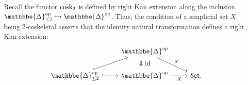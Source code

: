 \documentclass[a4paper,UKenglish,cleveref, autoref, thm-restate]{lipics-v2021}
\newcommand{\op}{\textup{op}}
\newcommand{\id}{\textup{id}}
\newcommand{\cosk}{\textup{cosk}}
\newcommand{\nerve}{\textup{nerve}}
\newcommand{\cat}[1]{\textup{\textsf{#1}}}%
\newcommand{\1}{\mathbbe{1}}
\newcommand{\2}{\mathbbe{2}}
\newcommand{\3}{\mathbbe{3}}
\newcommand{\DDelta}{\mathbbe{\Delta}}
\newcommand{\Cat}{\mathcal{C}{\kern-.75pt}\cat{at}}
\newcommand{\Set}{\mathcal{S}\cat{et}}
\begin{document}

Recall the functor $\cosk_2$ is defined by right Kan extension along the inclusion $\DDelta_{\leq 2}^\op \hookrightarrow \DDelta^\op$. Thus, the condition of a simplicial set $X$ being 2-coskeletal asserts that the identity natural transformation defines a right Kan extension:
\begin{equation}\label{eq:cosk-kan-ext} \begin{tikzcd} & \DDelta^\op \arrow[dr, "X"] \arrow[d, phantom, "\Downarrow\id"]\\ \DDelta_{\leq 2}^\op \arrow[ur, hook] \arrow[r, hook] & \DDelta^\op \arrow[r, "X"'] & \Set. \end{tikzcd}
\end{equation}
\end{document}
